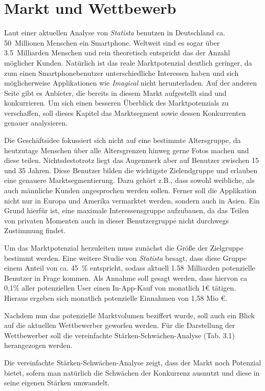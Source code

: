 \chapter{Markt und Wettbewerb}
Laut einer aktuellen Analyse von \textit{Statista} benutzen in Deutschland ca. 50~Millionen Menschen ein Smartphone. Weltweit sind es sogar über 3.5~Milliarden Menschen und rein theoretisch entspricht das der Anzahl möglicher Kunden. Natürlich ist das reale Marktpotenzial deutlich geringer, da zum einen Smartphonebenutzer unterschiedliche Interessen haben und sich möglicherweise Applikationen wie \textit{Imagical} nicht herunterladen. Auf der anderen Seite gibt es Anbieter, die bereits in diesem Markt aufgestellt sind und konkurrieren. Um sich einen besseren Überblick des Marktpotenzials zu verschaffen, soll dieses Kapitel das Marktsegment sowie dessen Konkurrenten genauer analysieren.

Die Geschäftsidee fokussiert sich nicht auf eine bestimmte Altersgruppe, da heutzutage Menschen über alle Altersgrenzen hinweg gerne Fotos machen und diese teilen. Nichtsdestotrotz liegt das Augenmerk aber auf Benutzer zwischen 15 und 35 Jahren. Diese Benutzer bilden die wichtigste Zielendgruppe und erlauben eine genauere Marktsegmentierung. Dazu gehört z.B., dass sowohl weibliche, als auch männliche Kunden angesprochen werden sollen. Ferner soll die Applikation nicht nur in Europa und Amerika vermarktet werden, sondern auch in Asien. Ein Grund hierfür ist, eine maximale Interessensgruppe aufzubauen, da das Teilen von privaten Momenten auch in dieser Benutzergruppe nicht durchwegs Zustimmung findet.

Um das Marktpotenzial herzuleiten muss zunächst die Größe der Zielgruppe bestimmt werden. Eine weitere Studie von \textit{Statista} besagt, dass diese Gruppe einem Anteil von ca. 45~\% entspricht, sodass aktuell 1.58~Milliarden potenzielle Benutzer in Frage kommen. Als Annahme soll gesagt werden, dass hiervon ca 0,1\% aller potenziellen User einen In-App-Kauf von monatlich 1€ tätigen. Hieraus ergeben sich monatlich potenzielle Einnahmen von 1,58 Mio €.

Nachdem nun das potenzielle Marktvolumen beziffert wurde, soll auch ein Blick auf die aktuellen Wettbewerber geworfen werden. Für die Darstellung der Wettbewerber soll die vereinfachte Stärken-Schwächen-Analyse (Tab. 3.1) herangezogen werden.

Die vereinfachte Stärken-Schwächen-Analyse zeigt, dass der Markt noch Potenzial bietet, sofern man natürlich die Schwächen der Konkurrenz ausnutzt und diese in seine eigenen Stärken umwandelt.

